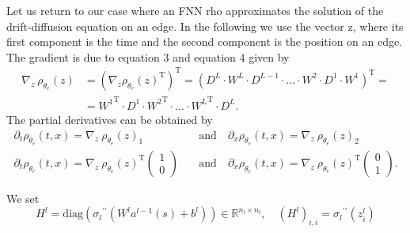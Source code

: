 Let us return to our case where an FNN rho approximates the solution of the drift-diffusion equation on an edge. In the following we use the vector z, where its first component is the time and the second component is the position on an edge. The gradient is due to equation 3 and equation 4 given by 
\begin{equation}
    \begin{split}
        \nabla_{z}  \ \rho_{\theta_e}\left(z\right) & = \left(\nabla_{z} \rho_{\theta_e}\left(z\right)^{\mathrm{T}} \right)^{\mathrm{T}} = \left(D^L \cdot W^L \cdot D^{L-1} \cdot \ldots \cdot W^2 \cdot D^1 \cdot W^{1} \right)^{\mathrm{T}} = \\
        & = {W^{1}}^{\mathrm{T}} \cdot D^{1} \cdot {W^{2}}^{\mathrm{T}} \cdot \ldots \cdot {W^{L}}^{\mathrm{T}}  \cdot  D^{L}. 
    \end{split}
\end{equation}
The partial derivatives can be obtained by 
\begin{equation*}
    \begin{split}
        \partial_t \rho_{\theta_e}\left(t,x\right) = \nabla_{z} \ \rho_{\theta_e}\left(z\right)_1 \quad & \text{and} \quad \partial_x \rho_{\theta_e}\left(t,x\right) = \nabla_{z} \ \rho_{\theta_e}\left(z\right)_2 \\
        \partial_t \rho_{\theta_e}\left(t,x\right) = {\nabla_{z} \ \rho_{\theta_e}\left(z\right)}^{\mathrm{T}} \begin{pmatrix} 1 \\ 0 \end{pmatrix} \quad & \text{and} \quad \partial_x \rho_{\theta_e}\left(t,x\right) = {\nabla_{z} \ \rho_{\theta_e}\left(z\right)}^{\mathrm{T}} \begin{pmatrix} 0 \\ 1 \end{pmatrix}.
    \end{split}
\end{equation*}





We set 
\begin{equation*}
    H^{l} = \mathrm{diag}\left({\sigma_{l}}^{\prime \prime}\left(W^{l} a^{l-1}\left(s\right) + b^{l}\right)\right) \in \mathbb{R}^{n_l \times n_l}, \quad \left(H^{l}\right)_{i, i} = {\sigma_{l}}^{\prime \prime} \left(z_{i}^{l}\right)
\end{equation*}

